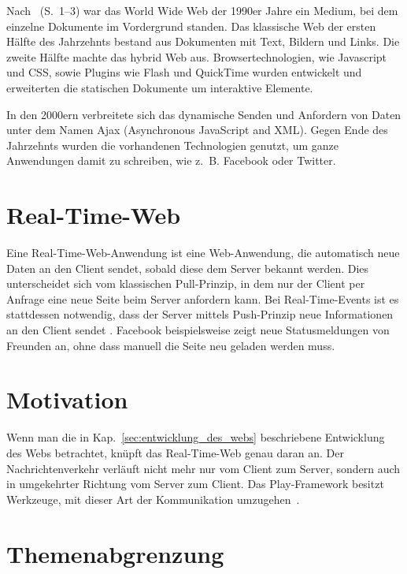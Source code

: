 \documentclass[draft=false
              ,paper=a4
              ,twoside=false
              ,fontsize=11pt
              ,headsepline
              ,BCOR10mm
              ,DIV11
              ]{scrbook}
\begin{document}
Nach \citealt{tavalsaari2011}~(S.~1--3) war das World Wide Web der 1990er Jahre ein Medium, bei dem einzelne Dokumente im Vordergrund standen.
Das klassische Web der ersten Hälfte des Jahrzehnts bestand aus Dokumenten mit Text, Bildern und Links.
Die zweite Hälfte machte das hybrid Web aus.
Browsertechnologien, wie Javascript und CSS, sowie Plugins wie Flash und QuickTime wurden entwickelt und erweiterten die statischen Dokumente um interaktive Elemente.

In den 2000ern verbreitete sich das dynamische Senden und Anfordern von Daten unter dem Namen Ajax (Asynchronous JavaScript and XML).
Gegen Ende des Jahrzehnts wurden die vorhandenen Technologien genutzt, um ganze Anwendungen damit zu schreiben, wie z.~B. Facebook oder Twitter.



\section{Real-Time-Web} %
\label{sec:real-time-web}

Eine Real-Time-Web-Anwendung ist eine Web-Anwendung, die automatisch neue Daten an den Client sendet, sobald diese dem Server bekannt werden.
Dies unterscheidet sich vom klassischen Pull-Prinzip, in dem nur der Client per Anfrage eine neue Seite beim Server anfordern kann.
Bei Real-Time-Events ist es stattdessen notwendig, dass der Server mittels Push-Prinzip neue Informationen an den Client sendet \cite[vgl.][S.~1]{bozdag2007}.
Facebook beispielsweise zeigt neue Statusmeldungen von Freunden an, ohne dass manuell die Seite neu geladen werden muss.



\section{Motivation} %
\label{sec:motivation}

Wenn man die in Kap.~\ref{sec:entwicklung_des_webs} beschriebene Entwicklung des Webs betrachtet, knüpft das Real-Time-Web genau daran an.
Der Nachrichtenverkehr verläuft nicht mehr nur vom Client zum Server, sondern auch in umgekehrter Richtung vom Server zum Client.
Das Play-Framework besitzt Werkzeuge, mit dieser Art der Kommunikation umzugehen~\cite[vgl.][S.~5]{drobi2012}.



\section{Themenabgrenzung} %
\label{sec:themenabgrenzung}
\end{document}
